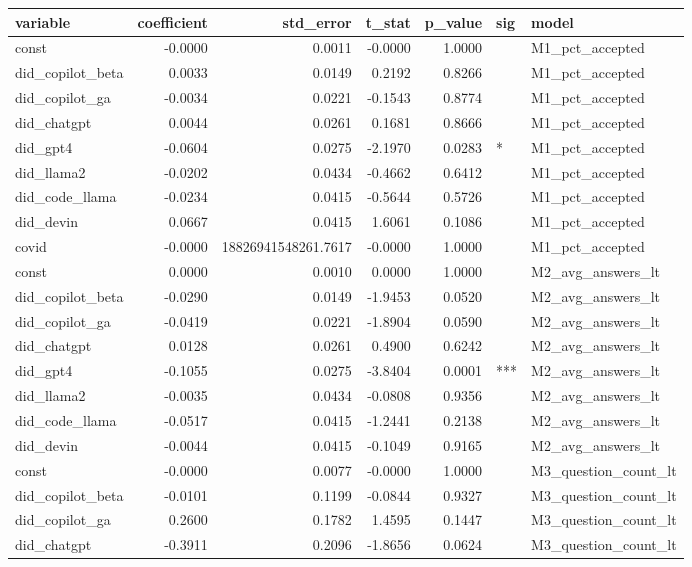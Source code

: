\begin{tabular}{lrrrrll}
\toprule
variable & coefficient & std_error & t_stat & p_value & sig & model \\
\midrule
const & -0.0000 & 0.0011 & -0.0000 & 1.0000 &  & M1_pct_accepted \\
did_copilot_beta & 0.0033 & 0.0149 & 0.2192 & 0.8266 &  & M1_pct_accepted \\
did_copilot_ga & -0.0034 & 0.0221 & -0.1543 & 0.8774 &  & M1_pct_accepted \\
did_chatgpt & 0.0044 & 0.0261 & 0.1681 & 0.8666 &  & M1_pct_accepted \\
did_gpt4 & -0.0604 & 0.0275 & -2.1970 & 0.0283 & * & M1_pct_accepted \\
did_llama2 & -0.0202 & 0.0434 & -0.4662 & 0.6412 &  & M1_pct_accepted \\
did_code_llama & -0.0234 & 0.0415 & -0.5644 & 0.5726 &  & M1_pct_accepted \\
did_devin & 0.0667 & 0.0415 & 1.6061 & 0.1086 &  & M1_pct_accepted \\
covid & -0.0000 & 18826941548261.7617 & -0.0000 & 1.0000 &  & M1_pct_accepted \\
const & 0.0000 & 0.0010 & 0.0000 & 1.0000 &  & M2_avg_answers_lt \\
did_copilot_beta & -0.0290 & 0.0149 & -1.9453 & 0.0520 &  & M2_avg_answers_lt \\
did_copilot_ga & -0.0419 & 0.0221 & -1.8904 & 0.0590 &  & M2_avg_answers_lt \\
did_chatgpt & 0.0128 & 0.0261 & 0.4900 & 0.6242 &  & M2_avg_answers_lt \\
did_gpt4 & -0.1055 & 0.0275 & -3.8404 & 0.0001 & *** & M2_avg_answers_lt \\
did_llama2 & -0.0035 & 0.0434 & -0.0808 & 0.9356 &  & M2_avg_answers_lt \\
did_code_llama & -0.0517 & 0.0415 & -1.2441 & 0.2138 &  & M2_avg_answers_lt \\
did_devin & -0.0044 & 0.0415 & -0.1049 & 0.9165 &  & M2_avg_answers_lt \\
const & -0.0000 & 0.0077 & -0.0000 & 1.0000 &  & M3_question_count_lt \\
did_copilot_beta & -0.0101 & 0.1199 & -0.0844 & 0.9327 &  & M3_question_count_lt \\
did_copilot_ga & 0.2600 & 0.1782 & 1.4595 & 0.1447 &  & M3_question_count_lt \\
did_chatgpt & -0.3911 & 0.2096 & -1.8656 & 0.0624 &  & M3_question_count_lt \\

\end{tabular}
